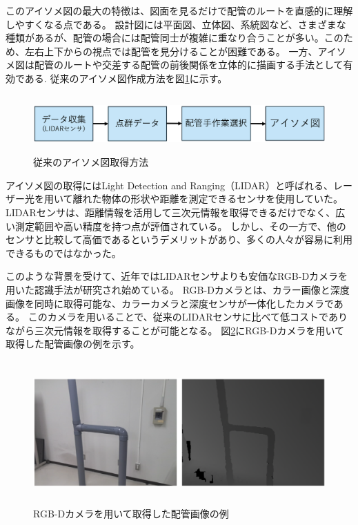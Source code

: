 このアイソメ図の最大の特徴は、図面を見るだけで配管のルートを直感的に理解しやすくなる点である。
設計図には平面図、立体図、系統図など、さまざまな種類があるが、配管の場合には配管同士が複雑に重なり合うことが多い。このため、左右上下からの視点では配管を見分けることが困難である。
一方、アイソメ図は配管のルートや交差する配管の前後関係を立体的に描画する手法として有効である.
従来のアイソメ図作成方法を図\ref{fig:f2}に示す。
\begin{figure}[htbt]
	\centering
	 \includegraphics[height=22mm]{Figure/existing_research.eps}
	 \caption{従来のアイソメ図取得方法}
	 \label{fig:f2}
\end{figure}

アイソメ図の取得にはLight Detection and Ranging（LIDAR）と呼ばれる、レーザー光を用いて離れた物体の形状や距離を測定できるセンサを使用していた。
LIDARセンサは、距離情報を活用して三次元情報を取得できるだけでなく、広い測定範囲や高い精度を持つ点が評価されている。
しかし、その一方で、他のセンサと比較して高価であるというデメリットがあり、多くの人々が容易に利用できるものではなかった。

このような背景を受けて、近年ではLIDARセンサよりも安価なRGB-Dカメラを用いた認識手法が研究され始めている。
RGB-Dカメラとは、カラー画像と深度画像を同時に取得可能な、カラーカメラと深度センサが一体化したカメラである。
このカメラを用いることで、従来のLIDARセンサに比べて低コストでありながら三次元情報を取得することが可能となる。
図\ref{fig:f3}にRGB-Dカメラを用いて取得した配管画像の例を示す。
\begin{figure}[htbt]
	\centering
	 \includegraphics[height=55mm]{Figure/ex_pipe.eps}
	 \caption{RGB-Dカメラを用いて取得した配管画像の例}
	 \label{fig:f3}
\end{figure}

